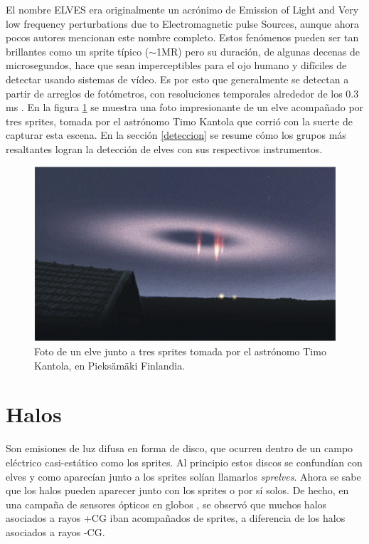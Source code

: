 \documentclass[12pt,oneside,openany,letter]{book}
\begin{document}
El nombre ELVES era originalmente un acrónimo de Emission of Light and Very low frequency perturbations due to Electromagnetic pulse Sources, aunque ahora pocos autores mencionan este nombre completo. Estos fenómenos pueden ser tan brillantes como un sprite típico ($\sim$1MR) pero su duración, de algunas decenas de microsegundos, hace que sean imperceptibles para el ojo humano y difíciles de detectar usando sistemas de vídeo. Es por esto que generalmente se detectan a partir de arreglos de fotómetros, con resoluciones temporales alrededor de los 0.3 ms \cite{Maiorana2014}. En la figura \ref{fig:elves_photo} se muestra una foto impresionante de un elve acompañado por tres sprites, tomada por el astrónomo Timo Kantola que corrió con la suerte de capturar esta escena. En la sección \ref{deteccion} se resume cómo los grupos más resaltantes logran la detección de elves con sus respectivos instrumentos. 
\begin{figure}
    \centering
    \includegraphics[scale=0.65]{figures/elves_photo.png}
    \caption[Foto de un elve tomada por el astrónomo Timo Kantola]{Foto de un elve junto a tres sprites tomada por el astrónomo Timo Kantola, en Pieksämäki Finlandia.}
    \label{fig:elves_photo}
\end{figure} 


\section{Halos}
Son emisiones de luz difusa en forma de disco, que ocurren dentro de un campo eléctrico casi-estático como los sprites. Al principio estos discos se confundían con elves y como aparecían junto a los sprites solían llamarlos \textit{sprelves}. Ahora se sabe que los halos pueden aparecer junto con los sprites o por sí solos. De hecho, en una campaña de sensores ópticos en globos \cite{BeringEtal2004}, se observó que muchos halos asociados a rayos +CG iban acompañados de sprites, a diferencia de los halos asociados a rayos -CG.
\end{document}
